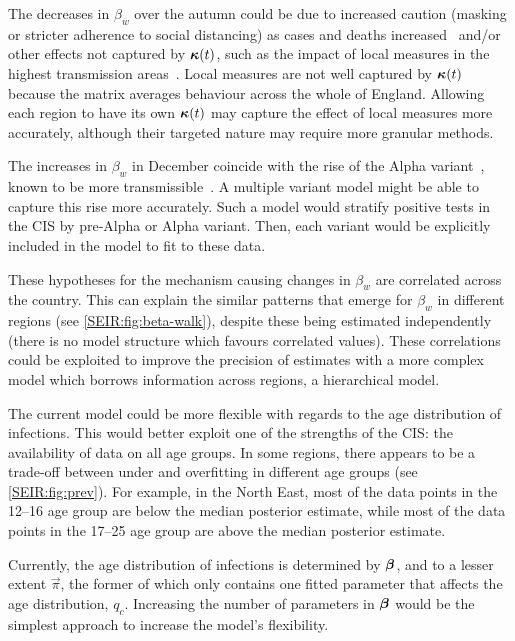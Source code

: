 \documentclass[thesis.tex]{subfiles}
\begin{document}
The decreases in $\beta_w$ over the autumn could be due to increased caution (\eg masking or stricter adherence to social distancing) as cases and deaths increased~\autocite{jarvisEffect} and/or other effects not captured by $\bm{\kappa}(t)$, such as the impact of local measures in the highest transmission areas~\autocite{scottCovid19}.
Local measures are not well captured by $\bm{\kappa}(t)$ because the matrix averages behaviour across the whole of England.
Allowing each region to have its own $\bm{\kappa}(t)$ may capture the effect of local measures more accurately, although their targeted nature may require more granular methods.

The increases in $\beta_w$ in December coincide with the rise of the Alpha variant~\autocite{lythgoeLineage}, known to be more transmissible~\autocite[e.g.][]{daviesEstimated}.
A multiple variant model might be able to capture this rise more accurately.
Such a model would stratify positive tests in the CIS by pre-Alpha or Alpha variant.
Then, each variant would be explicitly included in the model to fit to these data.

These hypotheses for the mechanism causing changes in $\beta_w$ are correlated across the country.
This can explain the similar patterns that emerge for $\beta_w$ in different regions (see \cref{SEIR:fig:beta-walk}), despite these being estimated independently (\ie there is no model structure which favours correlated values).
These correlations could be exploited to improve the precision of estimates with a more complex model which borrows information across regions, \eg a hierarchical model.

The current model could be more flexible with regards to the age distribution of infections.
This would better exploit one of the strengths of the CIS: the availability of data  on all age groups.
In some regions, there appears to be a trade-off between under and overfitting in different age groups (see \cref{SEIR:fig:prev}).
For example, in the North East, most of the data points in the 12--16 age group are below the median posterior estimate, while most of the data points in the 17--25 age group are above the median posterior estimate.

Currently, the age distribution of infections is determined by $\bm{\beta}$, and to a lesser extent $\vec{\pi}$, the former of which only contains one fitted parameter that affects the age distribution, $q_c$.
Increasing the number of parameters in $\bm{\beta}$ would be the simplest approach to increase the model's flexibility.
\end{document}
